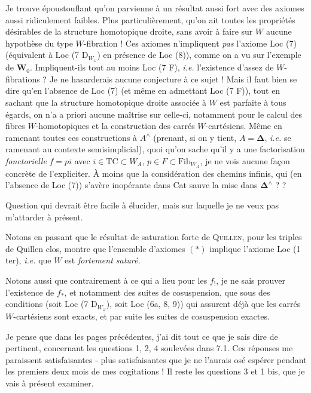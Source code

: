 \documentclass[11pt]{article}
\newcommand{\msp}[1]{\marginpar{\footnotesize [#1]}}
\begin{document}
Je trouve époustouflant qu'on parvienne à un résultat aussi fort avec des axiomes aussi ridiculement faibles. Plus particulièrement, qu'on ait toutes les propriétés désirables de la structure homotopique droite, sans avoir à faire sur $W$ aucune hypothèse du type $W$-fibration ! Ces axiomes n'impliquent \textit{pas} l'axiome Loc (7) (équivalent à Loc (7 $\mathrm{D}_{W_\omega}$) en présence de Loc (8)), comme on a vu sur l'exemple de $\mathbf{W}_0$. Impliquent-ils tout au moins Loc (7 F), \textit{i.e.} l'existence d'assez de $W$-fibrations ? Je ne hasarderais aucune conjecture à ce sujet ! Mais il faut bien se dire qu'en l'absence de Loc (7) (et même
\msp{page 106}
en admettant Loc (7 F)), tout en sachant que la structure homotopique droite associée à $W$ est parfaite à tous égards, on n'a a priori aucune maîtrise sur celle-ci, notamment pour le calcul des fibres $W$-homotopiques et la construction des carrés $W$-cartésiens. Même en ramenant toutes ces constructions à $A^\wedge$ (prenant, si on y tient, $A = \boldsymbol{\Delta}$, \textit{i.e.} se ramenant au contexte semisimplicial), quoi qu'on sache qu'il y a une factorisation \textit{fonctorielle} $f = pi$ avec $i \in \mathrm{TC} \subset W_A$, $p \in F \subset \mathrm{Fib}_{W_A}$, je ne vois aucune façon concrète de l'expliciter. À moins que la considération des chemins infinis, qui (en l'absence de Loc (7)) s'avère inopérante dans Cat sauve la mise dans $\boldsymbol{\Delta}^\wedge$ ? ?

\msp{page 107}
Question qui devrait être facile à élucider, mais sur laquelle je ne veux pas m'attarder à présent.

Notons en passant que le résultat de saturation forte de \textsc{Quillen}, pour les triples de Quillen clos, montre que l'ensemble d'axiomes $(*)$ implique l'axiome Loc (1 ter), \textit{i.e.} que $W$ est \textit{fortement saturé.}

Notons aussi que contrairement à ce qui a lieu pour les $f_!$, je ne sais prouver l'existence de $f_*$, et notamment des suites de cosuspension, que sous des conditions (soit Loc (7 $\mathrm{D}_{W_\omega}$), soit Loc (6a, 8, 9)) qui assurent déjà que les carrés $W$-cartésiens sont exacts, et par suite les suites de cosuspension exactes.

Je pense que dans les pages précédentes, j'ai dit tout ce que je sais dire de pertinent, concernant les questions 1, 2, 4 soulevées dans 7.1. Ces réponses me parais\msp{page 108}sent satisfaisantes - plus satisfaisantes que je ne l'aurais osé espérer pendant les premiers deux mois de mes cogitations ! Il reste les questions 3 et 1 bis, que je vais à présent examiner.
\end{document}
